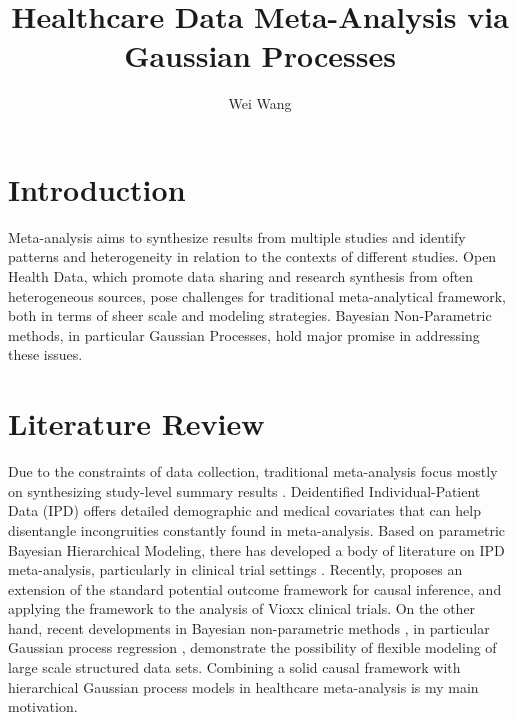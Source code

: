 \documentclass[8pt]{article}
\title{Healthcare Data Meta-Analysis via Gaussian Processes}
\author[1]{Wei Wang}
\affil[1]{\small{Department of Statistics, Columbia University}}
\begin{document}
\date{}
\maketitle

\vspace{-6ex}

\section{Introduction}
Meta-analysis aims to synthesize results from multiple studies and identify
patterns and heterogeneity in relation to the contexts of different
studies. Open Health Data, which promote data sharing and research synthesis
from often heterogeneous sources, pose challenges for traditional
meta-analytical framework, both in terms of sheer scale and modeling
strategies. Bayesian Non-Parametric methods, in particular Gaussian Processes,
hold major promise in addressing these issues.

\section{Literature Review}
Due to the constraints of data collection, traditional meta-analysis focus
mostly on synthesizing study-level summary results \citep{dersimonian1986meta}.
Deidentified Individual-Patient Data (IPD) offers detailed demographic and
medical covariates that can help disentangle incongruities constantly found in
meta-analysis. Based on parametric Bayesian Hierarchical Modeling, there has
developed a body of literature on IPD meta-analysis, particularly in clinical
trial settings \citep{higgins2001meta,
  tudorsmith2005investigating}. %
Recently, \citep{sobel2014meta} proposes an extension of the standard potential
outcome framework \citep{rubin1978bayesian} for causal inference, and applying
the framework to the analysis of Vioxx clinical trials.  On the other hand,
recent developments in Bayesian non-parametric methods
\citep{hjort2010bayesian}, in particular Gaussian process regression
\citep{williams2006gaussian}, demonstrate the possibility of flexible modeling
of large scale structured data sets. Combining a solid causal framework with
hierarchical Gaussian process models in healthcare meta-analysis is my main
motivation.
\end{document}
